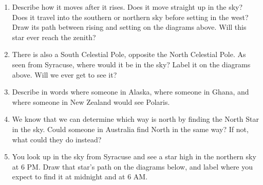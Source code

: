 \documentclass[12pt]{article}
\newcommand{\insp}{\vspace{1in}}
\begin{document}
\begin{enumerate}
	\item Describe how it moves after it rises. Does it move straight up in the sky? Does it travel into the southern or northern sky before setting in the west? Draw its path between rising and setting on the diagrams above. Will this star ever reach the zenith?
	
	\insp\bigskip
	

	\item There is also a South Celestial Pole, opposite the North Celestial Pole. As seen from Syracuse, where would it be in the sky? Label it on the diagrams above. Will we ever get to see it?
	
	\insp


   

    \item Describe in words where someone in Alaska, where someone in Ghana, and where someone in New Zealand would see Polaris.
       
    \insp\insp
     \item We know that we can determine which way is north by finding the North Star in the sky. Could someone in Australia find North in the same way? If not, what could they do instead?
 
    
    \insp\bigskip
    
    \item You look up in the sky from Syracuse and see a star high in the northern sky at 6 PM. Draw that star's path on the diagrams below, and label where you expect to find it at midnight and at 6 AM. 
    

\end{enumerate}
\end{document}
